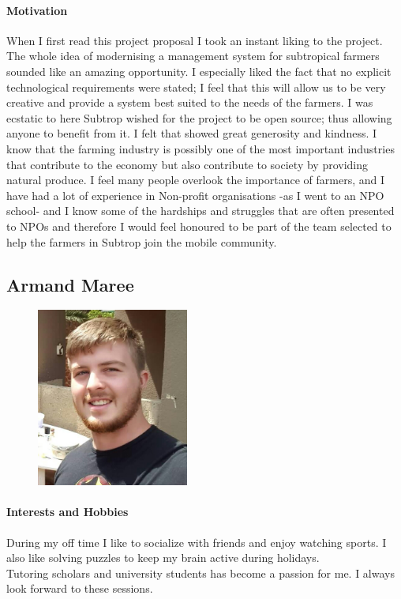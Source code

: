 \documentclass[english]{article}
\begin{document}
		\paragraph{Motivation}
		When I first read this project proposal I took an instant liking to the project. The whole idea of modernising a management system for subtropical farmers sounded like an amazing opportunity. I especially liked the fact that no explicit technological requirements were stated; I feel that this will allow us to be very creative and provide a system best suited to the needs of the farmers. I was ecstatic to here Subtrop wished for the project to be open source; thus allowing anyone to benefit from it. I felt that showed great generosity and kindness. I know that the farming industry is possibly one of the most important industries that contribute to the economy but also contribute to society by providing natural produce. I feel many people overlook the importance of farmers, and I have had a lot of experience in Non-profit organisations -as I went to an NPO school- and I know some of the hardships and struggles that are often presented to NPOs and therefore I would feel honoured to be part of the team selected to help the farmers in Subtrop join the mobile community.
		
		\subsection{Armand Maree}
			\begin{figure}
				\begin{center}
					\includegraphics[width=5cm]{armand.jpg}
				\end{center}
			\end{figure}
			\paragraph{Interests and Hobbies}
			During my off time I like to socialize with friends and enjoy watching sports. I also like solving puzzles to keep my brain active during holidays.\\
			Tutoring scholars and university students has become a passion for me. I always look forward to these sessions.
			
\end{document}
